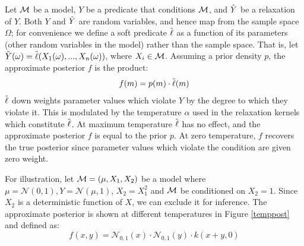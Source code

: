 Let ${\mathcal{M}}$ be a model, $Y$ be a predicate that conditions ${\mathcal{M}}$, and $\tilde{Y}$ be a relaxation of $Y$.
Both $Y$ and $\tilde{Y}$ are random variables, and hence map from the sample space $\Omega$;
for convenience we define a soft predicate $\tilde{\operatorname{\ell}}$ as a function of its parameters (other random variables in the model) rather than the sample space.
That is, let $\tilde{Y}(\omega) = \tilde{\operatorname{\ell}}(X_1(\omega), ..., X_n(\omega))$, where $X_i \in {\mathcal{M}}$.
Assuming a prior density $p$, the approximate posterior $f$ is the product:
\begin{equation}
f(m) = p(m) \cdot \tilde{\operatorname{\ell}}(m)
\end{equation}
$\tilde{\operatorname{\ell}}$ down weights parameter values which violate $Y$ by the degree to which they violate it. 
This is modulated by the temperature $\alpha$ used in the  relaxation kernels which constitute $\tilde{\operatorname{\ell}}$.
At maximum temperature $\tilde{\operatorname{\ell}}$ has no effect, and the approximate posterior $f$ is equal to the prior $p$.
At zero temperature, $f$ recovers the true posterior since parameter values which violate the condition are given zero weight.

For illustration, let ${\mathcal{M}} = (\mu, X_1, X_2)$ be a model where $\mu = \mathcal{N}(0, 1), Y = \mathcal{N}(\mu, 1)$, $X_2 = X_1^2$ and ${\mathcal{M}}$ be conditioned on $X_2 = 1$.
Since $X_2$ is a deterministic function of $X$, we can exclude it for inference.
The approximate posterior is shown at different temperatures in Figure \ref{temppost} and defined as:
\begin{equation}\label{approxposterior}
f(x, y) = \mathcal{N}_{0,1}(x) \cdot \mathcal{N}_{0,1}(y) \cdot k(x + y, 0) 
\end{equation}

